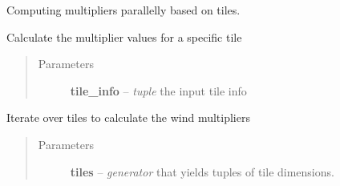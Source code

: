 \documentclass[letterpaper,10pt,english]{sphinxmanual}
\begin{document}
\begin{fulllineitems}
\label{docs/all_multipliers:all_multipliers.Multipliers}
Computing multipliers parallelly based on tiles.


\begin{fulllineitems}
\label{docs/all_multipliers:all_multipliers.Multipliers.multipliers_calculate}
Calculate the multiplier values for a specific tile
\begin{quote}\begin{description}
\item[{Parameters}] \leavevmode
\textbf{tile\_info} -- \emph{tuple} the input tile info

\end{description}\end{quote}

\end{fulllineitems}



\begin{fulllineitems}
\label{docs/all_multipliers:all_multipliers.Multipliers.parallelise_on_tiles}
Iterate over tiles to calculate the wind multipliers
\begin{quote}\begin{description}
\item[{Parameters}] \leavevmode
\textbf{tiles} -- \emph{generator} that yields tuples of tile dimensions.

\end{description}\end{quote}

\end{fulllineitems}


\end{fulllineitems}


\end{document}
